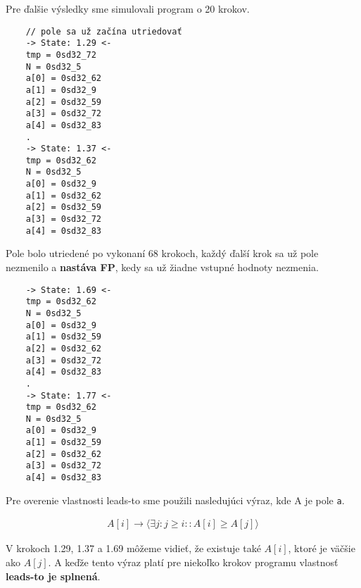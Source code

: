 Pre ďalšie výsledky sme simulovali program o 20 krokov.
\begin{lstlisting}
    // pole sa už začína utriedovať
    -> State: 1.29 <-
    tmp = 0sd32_72
    N = 0sd32_5
    a[0] = 0sd32_62
    a[1] = 0sd32_9
    a[2] = 0sd32_59
    a[3] = 0sd32_72
    a[4] = 0sd32_83
    .
    -> State: 1.37 <-
    tmp = 0sd32_62
    N = 0sd32_5
    a[0] = 0sd32_9
    a[1] = 0sd32_62
    a[2] = 0sd32_59
    a[3] = 0sd32_72
    a[4] = 0sd32_83
\end{lstlisting}

Pole bolo utriedené po vykonaní 68 krokoch, každý ďalší krok sa už pole nezmenilo a 
\textbf{nastáva FP}, kedy sa už žiadne vstupné hodnoty nezmenia.

\begin{lstlisting}
    -> State: 1.69 <-
    tmp = 0sd32_62
    N = 0sd32_5
    a[0] = 0sd32_9
    a[1] = 0sd32_59
    a[2] = 0sd32_62
    a[3] = 0sd32_72
    a[4] = 0sd32_83
    .
    -> State: 1.77 <-
    tmp = 0sd32_62
    N = 0sd32_5
    a[0] = 0sd32_9
    a[1] = 0sd32_59
    a[2] = 0sd32_62
    a[3] = 0sd32_72
    a[4] = 0sd32_83
\end{lstlisting}



Pre overenie vlastnosti leads-to sme použili nasledujúci výraz, kde A je pole \texttt{a}.
\begin{ceqn}
    \begin{align*}
        A[i] \rightarrow \langle \exists j: j \geq i :: A[i] \geq A[j] \rangle
    \end{align*}
\end{ceqn}

V krokoch 1.29, 1.37 a 1.69 môžeme vidieť, že existuje také $A[i]$, ktoré je väčšie ako 
$A[j]$. A keďže tento výraz platí pre niekoľko krokov programu vlastnosť \textbf{leads-to je 
splnená}.